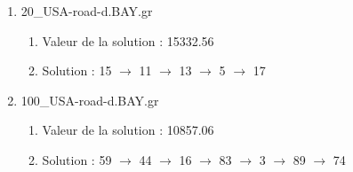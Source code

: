 \documentclass[12pt,a4paper]{article}
\begin{document}
\begin{enumerate}[label=$\bullet$]
    \item 20\_USA-road-d.BAY.gr
    \begin{enumerate}[label=-]
        \item Valeur de la solution : 15332.56
        \item Solution : 15 $\to$ 11 $\to$ 13 $\to$ 5 $\to$ 17
    \end{enumerate}
    \item 100\_USA-road-d.BAY.gr
    \begin{enumerate}[label=-]
        \item Valeur de la solution : 10857.06
        \item Solution : 59 $\to$ 44 $\to$ 16 $\to$ 83 $\to$ 3 $\to$ 89 $\to$ 74
    \end{enumerate}
\end{enumerate}
\end{document}
